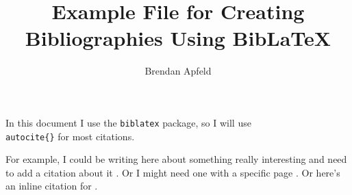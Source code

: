 \documentclass{article}
\title{Example File for Creating Bibliographies Using BibLaTeX}
\author{Brendan Apfeld}
\begin{document}
\maketitle

In this document I use the \texttt{biblatex} package, so I will use \texttt{\\autocite\{\}} for most citations.

For example, I could be writing here about something really interesting and need to add a citation about it \autocite{collier_2011}. Or I might need one with a specific page \autocite[34-40]{lijphart_1971}. Or here's an inline citation for \textcite{sartori_1970}.

\clearpage %
\printbibliography %
\end{document}
